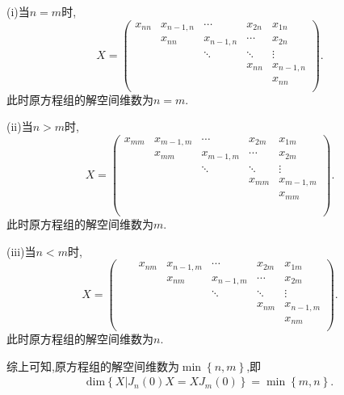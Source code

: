 \documentclass[../../main.tex]{subfiles}
\begin{document}
\begin{solution}
(i)当$n=m$时,
\[
X=\left( \begin{matrix}
x_{nn}&		x_{n-1,n}&		\cdots&		x_{2n}&		x_{1n}\\
&		x_{nn}&		x_{n-1,n}&		\cdots&		x_{2n}\\
&		&		\ddots&		\ddots&		\vdots\\
&		&		&		x_{nn}&		x_{n-1,n}\\
&		&		&		&		x_{nn}\\
\end{matrix} \right) .
\] 
此时原方程组的解空间维数为$n=m$.

(ii)当$n>m$时,
\[
X=\left( \begin{matrix}
x_{mm}&		x_{m-1,m}&		\cdots&		x_{2m}&		x_{1m}\\
&		x_{mm}&		x_{m-1,m}&		\cdots&		x_{2m}\\
&		&		\ddots&		\ddots&		\vdots\\
&		&		&		x_{mm}&		x_{m-1,m}\\
&		&		&		&		x_{mm}\\
&		&		&		&		\\
&		&		&		&		\\
\end{matrix} \right) .
\] 
此时原方程组的解空间维数为$m$.

(iii)当$n<m$时,
\[
X=\left( \begin{matrix}
	&		&		x_{nm}&		x_{n-1,m}&		\cdots&		x_{2m}&		x_{1m}\\
	&		&		&		x_{nm}&		x_{n-1,m}&		\cdots&		x_{2m}\\
	&		&		&		&		\ddots&		\ddots&		\vdots\\
	&		&		&		&		&		x_{nm}&		x_{n-1,m}\\
	&		&		&		&		&		&		x_{nm}\\
\end{matrix} \right) .
\] 
此时原方程组的解空间维数为$n $.

综上可知,原方程组的解空间维数为$\min \left\{ n,m \right\} $,即
\begin{align*}
\mathrm{dim}\left\{ X|J_n\left( 0 \right) X=XJ_m\left( 0 \right) \right\} =\min \left\{ m,n \right\} .
\end{align*}
\end{solution}
\end{document}
